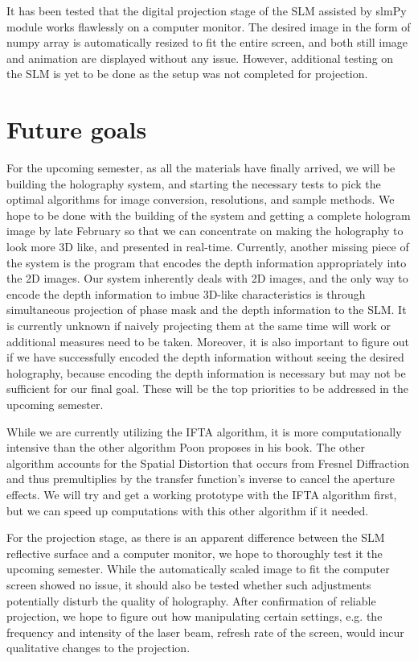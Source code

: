 \documentclass[12pt]{article}
\begin{document}
It has been tested that the digital projection stage of the SLM assisted by slmPy module works flawlessly on a computer monitor. The desired image in the form of numpy array is automatically resized to fit the entire screen, and both still image and animation are displayed without any issue. However, additional testing on the SLM is yet to be done as the setup was not completed for projection. 

\section{Future goals}
For the upcoming semester, as all the materials have finally arrived, we will be building the holography system, and starting the necessary tests to pick the optimal algorithms for image conversion, resolutions, and sample methods. We hope to be done with the building of the system and getting a complete hologram image by late February so that we can concentrate on making the holography to look more 3D like, and presented in real-time. Currently, another missing piece of the system is the program that encodes the depth information appropriately into the 2D images. Our system inherently deals with 2D images, and the only way to encode the depth information to imbue 3D-like characteristics is through simultaneous projection of phase mask and the depth information to the SLM. It is currently unknown if naively projecting them at the same time will work or additional measures need to be taken. Moreover, it is also important to figure out if we have successfully encoded the depth information without seeing the desired holography, because encoding the depth information is necessary but may not be sufficient for our final goal. These will be the top priorities to be addressed in the upcoming semester.

While we are currently utilizing the IFTA algorithm, it is more computationally intensive than the other algorithm Poon proposes in his book. The other algorithm accounts for the Spatial Distortion that occurs from Fresnel Diffraction and thus premultiplies by the transfer function's inverse to cancel the aperture effects. We will try and get a working prototype with the IFTA algorithm first, but we can speed up computations with this other algorithm if it needed.

For the projection stage, as there is an apparent difference between the SLM reflective surface and a computer monitor, we hope to thoroughly test it the upcoming semester. While the automatically scaled image to fit the computer screen showed no issue, it should also be tested whether such adjustments potentially disturb the quality of holography. After confirmation of reliable projection, we hope to figure out how manipulating certain settings, e.g. the frequency and intensity of the laser beam, refresh rate of the screen, would incur qualitative changes to the projection. 



\end{document}
